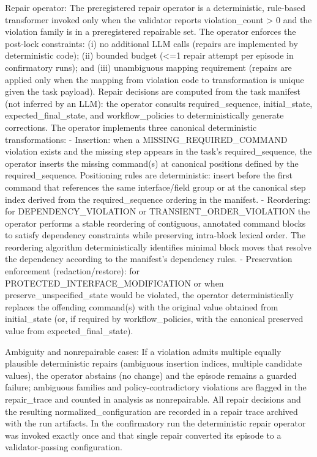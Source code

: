 \documentclass[conference]{IEEEtran}
\begin{document}
Repair operator: The preregistered repair operator is a deterministic, rule-based transformer invoked only when the validator reports violation\_count > 0 and the violation family is in a preregistered repairable set. The operator enforces the post-lock constraints: (i) no additional LLM calls (repairs are implemented by deterministic code); (ii) bounded budget (<=1 repair attempt per episode in confirmatory runs); and (iii) unambiguous mapping requirement (repairs are applied only when the mapping from violation code to transformation is unique given the task payload). Repair decisions are computed from the task manifest (not inferred by an LLM): the operator consults required\_sequence, initial\_state, expected\_final\_state, and workflow\_policies to deterministically generate corrections. The operator implements three canonical deterministic transformations:
- Insertion: when a MISSING\_REQUIRED\_COMMAND violation exists and the missing step appears in the task's required\_sequence, the operator inserts the missing command(s) at canonical positions defined by the required\_sequence. Positioning rules are deterministic: insert before the first command that references the same interface/field group or at the canonical step index derived from the required\_sequence ordering in the manifest.
- Reordering: for DEPENDENCY\_VIOLATION or TRANSIENT\_ORDER\_VIOLATION the operator performs a stable reordering of contiguous, annotated command blocks to satisfy dependency constraints while preserving intra-block lexical order. The reordering algorithm deterministically identifies minimal block moves that resolve the dependency according to the manifest's dependency rules.
- Preservation enforcement (redaction/restore): for PROTECTED\_INTERFACE\_MODIFICATION or when preserve\_unspecified\_state would be violated, the operator deterministically replaces the offending command(s) with the original value obtained from initial\_state (or, if required by workflow\_policies, with the canonical preserved value from expected\_final\_state).

Ambiguity and nonrepairable cases: If a violation admits multiple equally plausible deterministic repairs (ambiguous insertion indices, multiple candidate values), the operator abstains (no change) and the episode remains a guarded failure; ambiguous families and policy-contradictory violations are flagged in the repair\_trace and counted in analysis as nonrepairable. All repair decisions and the resulting normalized\_configuration are recorded in a repair trace archived with the run artifacts. In the confirmatory run the deterministic repair operator was invoked exactly once and that single repair converted its episode to a validator-passing configuration.
\end{document}
